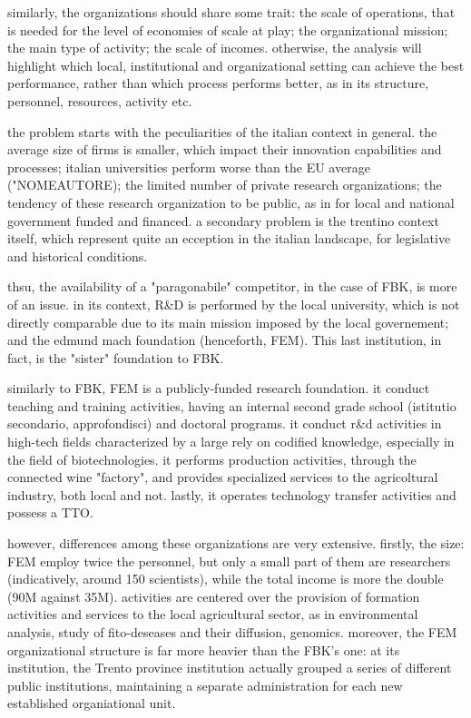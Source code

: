 similarly, the organizations should share some trait: the scale of operations, that is needed for the level of economies of scale at play; the organizational mission; the main type of activity; the scale of incomes. otherwise, the analysis will highlight which local, institutional and organizational setting can achieve the best performance, rather than which process performs better, as in its structure, personnel, resources, activity etc.

the problem starts with the peculiarities of the italian context in general. the average size of firms is smaller, which impact their innovation capabilities and processes; italian universities perform worse than the EU average ("NOMEAUTORE); the limited number of private research organizations; the tendency of these research organization to be public, as in for local and national government funded and financed. a secondary problem is the trentino context itself, which represent quite an ecception in the italian landscape, for legislative and historical conditions. 

thsu, the availability of a "paragonabile" competitor, in the case of FBK, is more of an issue. in its context, R\&D is performed by the local university, which is not directly comparable due to its main mission imposed by the local governement; and the edmund mach foundation (henceforth, FEM). This last institution, in fact, is the "sister" foundation to FBK. 

similarly to FBK, FEM is a publicly-funded research foundation. it conduct teaching and training activities, having an internal second grade school (istitutio secondario, approfondisci) and doctoral programs. it conduct r\&d activities in high-tech fields characterized by a large rely on codified knowledge, especially in the field of biotechnologies. it performs production activities, through the connected wine "factory", and provides specialized services to the agricoltural industry, both local and not. lastly, it operates technology transfer activities and possess a TTO.

however, differences among these organizations are very extensive. firstly, the size: FEM employ twice the personnel, but only a small part of them are researchers (indicatively, around 150 scientists), while the total income is more the double (90M against 35M). activities are centered over the provision of formation activities and services to the local agricultural sector, as in environmental analysis, study of fito-deseases and their diffusion, genomics. moreover, the FEM organizational structure is far more heavier than the FBK's one: at its institution, the Trento province institution actually grouped a series of different public institutions, maintaining a separate administration for each new established organiational unit. 

